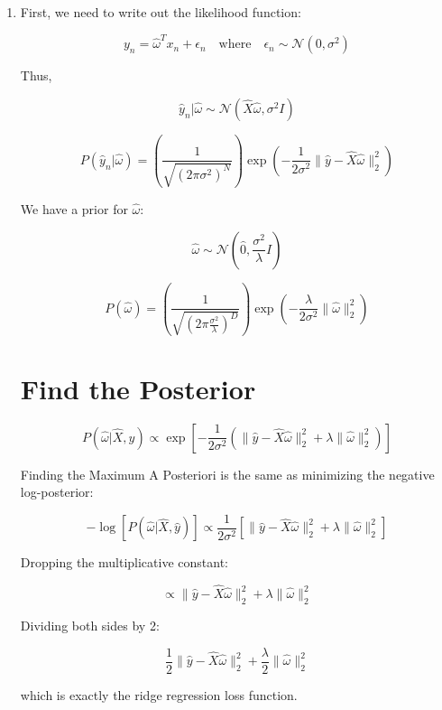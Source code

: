 \documentclass[submit]{../harvardml}
\begin{document}
\newpage
\begin{tcolorbox}[title=Solution, colback=white, colframe=black, breakable]
  \begin{enumerate}
      \item 
      
      First, we need to write out the likelihood function:

\[
y_n = \hat{\omega}^T x_n + \epsilon_n \quad \text{where} \quad \epsilon_n \sim \mathcal{N}(0, \sigma^2)
\]

Thus,

\[
\hat{y}_n | \hat{\omega} \sim \mathcal{N}(\hat{X} \hat{\omega}, \sigma^2 I)
\]

\[
P(\hat{y}_n | \hat{\omega}) = \left( \frac{1}{\sqrt{(2\pi \sigma^2)^N}} \right) \exp \left( -\frac{1}{2\sigma^2} \|\hat{y} - \hat{X} \hat{\omega} \|_2^2 \right)
\]

We have a prior for \( \hat{\omega} \):

\[
\hat{\omega} \sim \mathcal{N} (\hat{0}, \frac{\sigma^2}{\lambda} I)
\]

\[
P(\hat{\omega}) = \left( \frac{1}{\sqrt{(2\pi \frac{\sigma^2}{\lambda})^D}} \right) \exp \left( -\frac{\lambda}{2\sigma^2} \|\hat{\omega} \|_2^2 \right)
\]

\section*{Find the Posterior}

\[
P(\hat{\omega} | \hat{X}, \hat{y}) \propto \exp \left[ -\frac{1}{2\sigma^2} \left( \|\hat{y} - \hat{X} \hat{\omega} \|_2^2 + \lambda \|\hat{\omega} \|_2^2 \right) \right]
\]

Finding the Maximum A Posteriori is the same as minimizing the negative log-posterior:

\[
-\log \left[ P(\hat{\omega} | \hat{X}, \hat{y}) \right] \propto \frac{1}{2\sigma^2} \left[ \|\hat{y} - \hat{X} \hat{\omega} \|_2^2 + \lambda \|\hat{\omega} \|_2^2 \right]
\]

Dropping the multiplicative constant:

\[
\propto \|\hat{y} - \hat{X} \hat{\omega} \|_2^2 + \lambda \|\hat{\omega} \|_2^2
\]

Dividing both sides by 2:

\[
\frac{1}{2} \|\hat{y} - \hat{X} \hat{\omega} \|_2^2 + \frac{\lambda}{2} \|\hat{\omega} \|_2^2
\]

which is exactly the ridge regression loss function.


\end{enumerate}
\end{tcolorbox}
\end{document}
